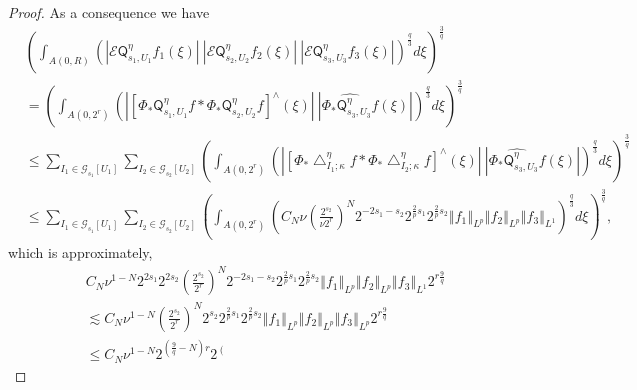 \documentclass{amsart}%
\theoremstyle{plain}
\numberwithin{equation}{section}
\begin{document}
\begin{proof}
As a consequence we have%
\begin{align*}
&  \left(  \int_{A\left(  0,R\right)  }\left(  \left\vert \mathcal{E}%
\mathsf{Q}_{s_{1},U_{1}}^{\eta}f_{1}\left(  \xi\right)  \right\vert
\ \left\vert \mathcal{E}\mathsf{Q}_{s_{2},U_{2}}^{\eta}f_{2}\left(
\xi\right)  \right\vert \ \left\vert \mathcal{E}\mathsf{Q}_{s_{3},U_{3}}%
^{\eta}f_{3}\left(  \xi\right)  \right\vert \right)  ^{\frac{q}{3}}%
d\xi\right)  ^{\frac{3}{q}}\\
&  =\left(  \int_{A\left(  0,2^{r}\right)  }\left(  \left\vert \left[
\Phi_{\ast}\mathsf{Q}_{s_{1},U_{1}}^{\eta}f\ast\Phi_{\ast}\mathsf{Q}%
_{s_{2},U_{2}}^{\eta}f\right]  ^{\wedge}\left(  \xi\right)  \right\vert
\ \left\vert \widehat{\Phi_{\ast}\mathsf{Q}_{s_{3},U_{3}}^{\eta}f}\left(
\xi\right)  \right\vert \right)  ^{\frac{q}{3}}d\xi\right)  ^{\frac{3}{q}}\\
&  \leq\sum_{I_{1}\in\mathcal{G}_{s_{1}}\left[  U_{1}\right]  }\sum_{I_{2}%
\in\mathcal{G}_{s_{2}}\left[  U_{2}\right]  }\left(  \int_{A\left(
0,2^{r}\right)  }\left(  \left\vert \left[  \Phi_{\ast}\bigtriangleup
_{I_{1};\kappa}^{\eta}f\ast\Phi_{\ast}\bigtriangleup_{I_{2};\kappa}^{\eta
}f\right]  ^{\wedge}\left(  \xi\right)  \right\vert \ \left\vert \widehat
{\Phi_{\ast}\mathsf{Q}_{s_{3},U_{3}}^{\eta}f}\left(  \xi\right)  \right\vert
\right)  ^{\frac{q}{3}}d\xi\right)  ^{\frac{3}{q}}\\
&  \leq\sum_{I_{1}\in\mathcal{G}_{s_{1}}\left[  U_{1}\right]  }\sum_{I_{2}%
\in\mathcal{G}_{s_{2}}\left[  U_{2}\right]  }\left(  \int_{A\left(
0,2^{r}\right)  }\left(  C_{N}\nu\left(  \frac{2^{s_{2}}}{\nu2^{r}}\right)
^{N}2^{-2s_{1}-s_{2}}2^{\frac{2}{p}s_{1}}2^{\frac{2}{p}s_{2}}\left\Vert
f_{1}\right\Vert _{L^{p}}\left\Vert f_{2}\right\Vert _{L^{p}}\left\Vert
f_{3}\right\Vert _{L^{1}}\right)  ^{\frac{q}{3}}d\xi\right)  ^{\frac{3}{q}},
\end{align*}
which is approximately,%
\begin{align*}
&  C_{N}\nu^{1-N}2^{2s_{1}}2^{2s_{2}}\left(  \frac{2^{s_{2}}}{2^{r}}\right)
^{N}2^{-2s_{1}-s_{2}}2^{\frac{2}{p}s_{1}}2^{\frac{2}{p}s_{2}}\left\Vert
f_{1}\right\Vert _{L^{p}}\left\Vert f_{2}\right\Vert _{L^{p}}\left\Vert
f_{3}\right\Vert _{L^{1}}2^{r\frac{9}{q}}\\
&  \lesssim C_{N}\nu^{1-N}\left(  \frac{2^{s_{2}}}{2^{r}}\right)  ^{N}%
2^{s_{2}}2^{\frac{2}{p}s_{1}}2^{\frac{2}{p}s_{2}}\left\Vert f_{1}\right\Vert
_{L^{p}}\left\Vert f_{2}\right\Vert _{L^{p}}\left\Vert f_{3}\right\Vert
_{L^{p}}2^{r\frac{9}{q}}\\
&  \leq C_{N}\nu^{1-N}2^{\left(  \frac{9}{q}-N\right)  r}2^{\left(
}
\end{align*}
\end{proof}
\end{document}
